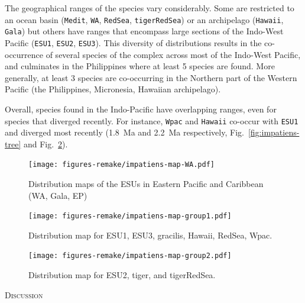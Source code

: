 \documentclass[12pt,letterpaper]{article}\usepackage[]{graphicx}\usepackage[]{color}
\renewcommand{\section}[1]{%
\bigskip
\begin{center}
\begin{Large}
\normalfont\scshape #1
\medskip
\end{Large}
\end{center}}
\begin{document}
The geographical ranges of the species vary considerably. Some are restricted to
an ocean basin (\texttt{Medit}, \texttt{WA}, \texttt{RedSea},
\texttt{tigerRedSea}) or an archipelago (\texttt{Hawaii}, \texttt{Gala}) but
others have ranges that encompass large sections of the Indo-West Pacific
(\texttt{ESU1}, \texttt{ESU2}, \texttt{ESU3}). This diversity of distributions
results in the co-occurrence of several species of the complex across most of
the Indo-West Pacific, and culminates in the Philippines where at least 5
species are found. More generally, at least 3 species are co-occurring in the
Northern part of the Western Pacific (the Philippines, Micronesia, Hawaiian
archipelago).

Overall, species found in the Indo-Pacific have overlapping ranges, even for
species that diverged recently. For instance, \texttt{Wpac} and \texttt{Hawaii}
co-occur with \texttt{ESU1} and diverged most recently (1.8~Ma and 2.2~Ma
respectively, Fig.~\ref{fig:impatiens-tree} and
Fig.~\ref{fig:impatiens-map-group1}).


\begin{figure}
  {\centering \texttt{[image: figures-remake/impatiens-map-WA.pdf]}}

  \caption{Distribution maps of the ESUs in Eastern Pacific and Caribbean (WA,
    Gala, EP)}\label{fig:impatiens-map-WA}
\end{figure}

\begin{figure}
  {\centering \texttt{[image: figures-remake/impatiens-map-group1.pdf]}}

  \caption{Distribution map for ESU1, ESU3, gracilis, Hawaii, RedSea, Wpac.}
  \label{fig:impatiens-map-group1}
\end{figure}

\begin{figure}
  {\centering \texttt{[image: figures-remake/impatiens-map-group2.pdf]}}

  \caption{Distribution map for ESU2, tiger, and tigerRedSea.}
  \label{fig:impatiens-map-group2}
\end{figure}


\section{Discussion}
\end{document}
